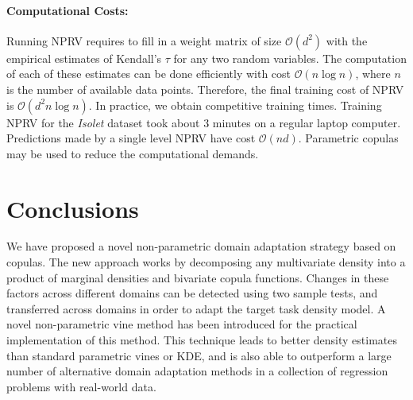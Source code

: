 \documentclass{article}
\begin{document}
\paragraph{Computational Costs:} Running \textsc{NPRV} requires to fill in a
weight matrix of size $\mathcal{O}(d^2)$ with the empirical estimates of
Kendall's $\tau$ for any two random variables.  The computation of each of
these estimates can be done efficiently with cost $\mathcal{O}(n\log n)$, where
$n$ is the number of available data points. Therefore, the final training cost
of \textsc{NPRV} is $\mathcal{O}(d^2 n \log n)$.  In practice, we obtain
competitive training times. Training \textsc{NPRV} for the  \emph{Isolet}
dataset took about 3 minutes on a regular laptop computer. Predictions made by
a single level \textsc{NPRV} have cost $\mathcal{O}(nd)$. Parametric copulas
may be used to reduce the computational demands.

\section{Conclusions}
We have proposed a novel non-parametric domain adaptation strategy based on
copulas.  The new approach works by decomposing any multivariate density into a
product of marginal densities and bivariate copula functions. Changes in these
factors across different domains can be detected using two sample tests, and
transferred across domains in order to adapt the target task density model.  A
novel non-parametric vine method has been introduced for the practical
implementation of this method. This technique leads to better density estimates
than standard parametric vines or KDE, and is also able to outperform a large
number of alternative domain adaptation methods in a collection of regression
problems with real-world data.

\newpage



\end{document}
